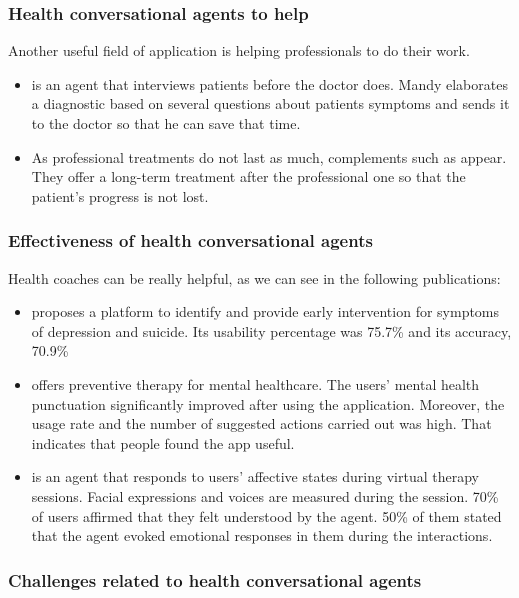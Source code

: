 \documentclass[12pt,english]{article}
\begin{document}
\subsubsection{Health conversational agents to help}

Another useful field of application is helping professionals to do their work.

\begin{itemize}
  \item \cite{Ni201738} is an agent that interviews patients before the doctor does. Mandy elaborates a diagnostic based on several questions about patients symptoms and sends it to the doctor so that he can save that time.
  \item As professional treatments do not last as much, complements such as \cite{DAlfonso2017} appear. They offer a long-term treatment after the professional one so that the patient's progress is not lost.
\end{itemize}

\subsubsection{Effectiveness of health conversational agents}

Health coaches can be really helpful, as we can see in the following publications:

\begin{itemize}
  \item \cite{Breso2016297} proposes a platform to identify and provide early intervention for symptoms of depression and suicide. Its usability percentage was 75.7\% and its accuracy, 70.9\%
  \item \cite{Hirano2017} offers preventive therapy for mental healthcare. The users' mental health punctuation significantly improved after using the application. Moreover, the usage rate and the number of suggested actions carried out was high. That indicates that people found the app useful.
  \item \cite{Ring2016} is an agent that responds to users' affective states during virtual therapy sessions. Facial expressions and voices are measured during the session. 70\% of users affirmed that they felt understood by the agent. 50\% of them stated that the agent evoked emotional responses in them during the interactions.
\end{itemize}

\subsubsection{Challenges related to health conversational agents}
\end{document}
